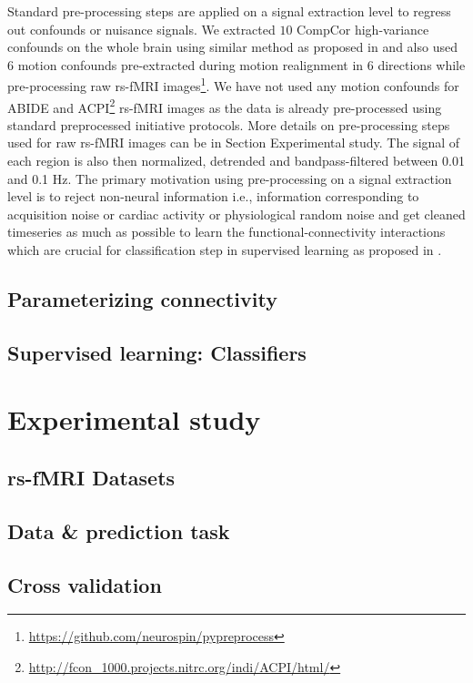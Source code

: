\documentclass[5p]{elsarticle}
\begin{document}
Standard pre-processing steps are applied on a signal extraction level
to regress out confounds or nuisance signals. We extracted $10$ CompCor
high-variance confounds on the whole brain using similar method as
proposed in \citep{behzadi2007} and also used $6$ motion confounds pre-extracted
during motion realignment in $6$ directions while pre-processing raw rs-fMRI
images\footnote{\url{https://github.com/neurospin/pypreprocess}}.
We have not used any motion
confounds for ABIDE \citep{dimartino2014autism} and
ACPI\footnote{\url{http://fcon_1000.projects.nitrc.org/indi/ACPI/html/}}
rs-fMRI images as the data is already
pre-processed using standard preprocessed initiative protocols.
More details on pre-processing steps used for raw rs-fMRI
images can be in Section Experimental study.
The signal of each region is also
then normalized, detrended and bandpass-filtered between 0.01
and 0.1 Hz. The primary motivation using pre-processing on a signal extraction
level is to reject non-neural information i.e., information corresponding to
acquisition noise or cardiac activity or physiological random noise and get
cleaned timeseries as much as possible to learn the functional-connectivity
interactions which are crucial for classification step in supervised learning
as proposed in \citep{varoquaux2013connectomes}.

\subsection{Parameterizing connectivity}

\subsection{Supervised learning: Classifiers}

\section{Experimental study}

\subsection{rs-fMRI Datasets}

\subsection{Data \& prediction task}
\subsection{Cross validation}
\end{document}
